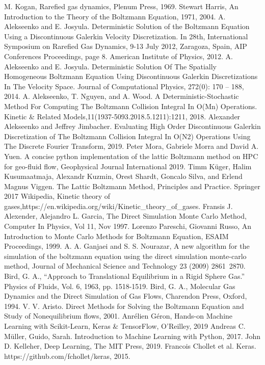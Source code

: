 \documentclass{article}
\begin{document}
\begin{thebibliography}{99}
	M. Kogan, Rarefied gas dynamics, Plenum Press, 1969.
	Stewart Harris, An Introduction to the Theory of the Boltzmann Equation, 1971, 2004.
	A. Alekseenko and E. Josyula.  Deterministic Solution of the Boltzmann Equation Using a Discontinuous Galerkin Velocity Discretization. In 28th, International Symposium on Rarefied Gas Dynamics, 9-13 July 2012, Zaragoza, Spain, AIP Conferences Proceedings, page 8. American Institute of Physics, 2012.
	A. Alekseenko and E. Josyula.  Deterministic Solution Of The Spatially Homogeneous Boltzmann Equation Using Discontinuous Galerkin Discretizations In The Velocity Space. Journal of Computational Physics, 272(0): 170 – 188, 2014.
	A. Alekseenko, T. Nguyen, and A. Wood. A Deterministic-Stochastic Method For Computing The Boltzmann Collision Integral In O(Mn) Operations. Kinetic \& Related Models,11(1937-5093.2018.5.1211):1211, 2018.
	Alexander Alekseenko and Jeffrey Jimbacher. Evaluating High Order Discontinuous Galerkin Discretization of The Boltzmann Collision Integral In O(N2) Operations Using The Discrete Fourier Transform, 2019.
	 Peter Mora, Gabriele Morra and David A. Yuen. A concise python implementation of the lattic Boltzmann method on HPC for geo-fluid flow, Geophysical Journal International 2019.
	 Timm K\"{u}ger, Halim Kusumaatmaja, Alexandr Kuzmin, Orest Shardt, Goncalo Silva, and Erlend Magnus Viggen. The Lattic Boltzmann Method, Principles and Practice. Springer 2017
	Wikipedia, Kinetic theory of gases,https://en.wikipedia.org/wiki/Kinetic\_theory\_of\_gases.
	Fransis J. Alexender, Alejandro L. Garcia, The Direct Simulation Monte Carlo Method, Computer In Physics, Vol 11, Nov 1997.
	Lorenzo Pareschi, Giovanni Russo, An Introduction to Monte Carlo Methods for Boltzmann Equation, ESAIM Proceedings, 1999.
	A. A. Ganjaei and S. S. Nourazar, A new algorithm for the simulation of the boltzmann equation using the direct simulation monte-carlo method, Journal of Mechanical Science and Technology 23 (2009) 2861~2870.
	Bird, G. A., “Approach to Translational Equilibrium in a Rigid Sphere Gas.” Physics of Fluids, Vol. 6, 1963, pp. 1518-1519.
	Bird, G. A., Molecular Gas Dynamics and the Direct Simulation of Gas Flows, Charendon Press, Oxford, 1994.
	 V. V. Aristo. Direct Methods for Solving the Boltzmann Equation and Study of Nonequilibrium flows, 2001.
	Anr\'{e}lien G\'{e}ron, Hands-on Machine Learning with Scikit-Learn, Keras \& TensorFlow, O'Reilley, 2019
	Andreas C. Müller, Guido, Sarah. Introduction to Machine Learning with Python, 2017.
	John D. Kelleher, Deep Learning, The MIT Press, 2019.
	Francois Chollet et al. Keras. https://github.com/fchollet/keras, 2015.
\end{thebibliography}
\end{document}
